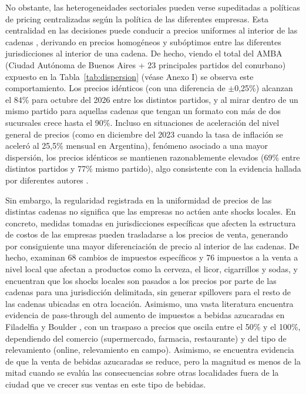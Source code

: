 No obstante, las heterogeneidades sectoriales pueden verse supeditadas a políticas de pricing centralizadas según la política de las diferentes empresas. Esta centralidad en las decisiones puede conducir a precios uniformes al interior de las cadenas \parencite{dellavigna2019}, derivando en precios homogéneos y subóptimos entre las diferentes jurisdicciones al interior de una cadena. De hecho, viendo el total del AMBA (Ciudad Autónoma de Buenos Aires + 23 principales partidos del conurbano) expuesto en la Tabla~\ref{tab:dispersion} (véase Anexo I) se observa este comportamiento. Los precios idénticos (con una diferencia de \(\pm\)0,25\%) alcanzan el 84\% para octubre del 2026 entre los distintos partidos, y al mirar dentro de un mismo partido para aquellas cadenas que tengan un formato con más de dos sucursales crece hasta el 90\%. Incluso en situaciones de aceleración del nivel general de precios (como en diciembre del 2023 cuando la tasa de inflación se aceleró al 25,5\% mensual en Argentina), fenómeno asociado a una mayor dispersión, los precios idénticos se mantienen razonablemente elevados (69\% entre distintos partidos y 77\% mismo partido), algo consistente con la evidencia hallada por diferentes autores \parencite{nakamura2008,aparicio2021,hitsch2021}.

Sin embargo, la regularidad registrada en la uniformidad de precios de las distintas cadenas no significa que las empresas no actúen ante shocks locales. En concreto, medidas tomadas en jurisdicciones específicas que afecten la estructura de costos de las empresas pueden trasladarse a los precios de venta, generando por consiguiente una mayor diferenciación de precio al interior de las cadenas. De hecho, \textcite{butters2022} examinan 68 cambios de impuestos específicos y 76 impuestos a la venta a nivel local que afectan a productos como la cerveza, el licor, cigarrillos y sodas, y encuentran que los shocks locales son pasados a los precios por parte de las cadenas para una jurisdicción delimitada, sin generar spillovers para el resto de las cadenas ubicadas en otra locación. Asimismo, una vasta literatura encuentra evidencia de pass-through del aumento de impuestos a bebidas azucaradas en Filadelfia y Boulder \parencite{cawley2018,roberto2019,seiler2020}, con un traspaso a precios que oscila entre el 50\% y el 100\%, dependiendo del comercio (supermercado, farmacia, restaurante) y del tipo de relevamiento (online, relevamiento en campo). Asimismo, se encuentra evidencia de que la venta de bebidas azucaradas se reduce, pero la magnitud es menos de la mitad cuando se evalúa las consecuencias sobre otras localidades fuera de la ciudad que ve crecer sus ventas en este tipo de bebidas.

